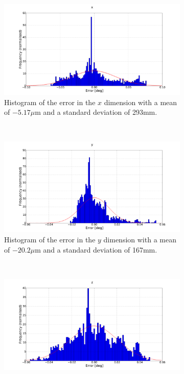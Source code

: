 \begin{figure}
  \begin{subfigure}{0.45\textwidth}
     \includegraphics[clip, trim = 150 50 155 0, width=\textwidth]{figures/chapter3/norm_x}
     \caption{Histogram of the error in the $x$ dimension with a mean of $-5.17\mu$m and a standard deviation of 293mm.}
  \label{fig:norm-x}
  \end{subfigure}
~
  \begin{subfigure}{0.45\textwidth}
     \includegraphics[clip, trim = 150 50 155 0, width=\textwidth]{figures/chapter3/norm_y}
     \caption{Histogram of the error in the $y$ dimension with a mean of $-20.2\mu$m and a standard deviation of 167mm.}
  \label{fig:norm-y}
  \end{subfigure}
~
  \begin{subfigure}{0.45\textwidth}
     \includegraphics[clip, trim = 150 50 155 0, width=\textwidth]{figures/chapter3/norm_z}

\end{subfigure}
\end{figure}
